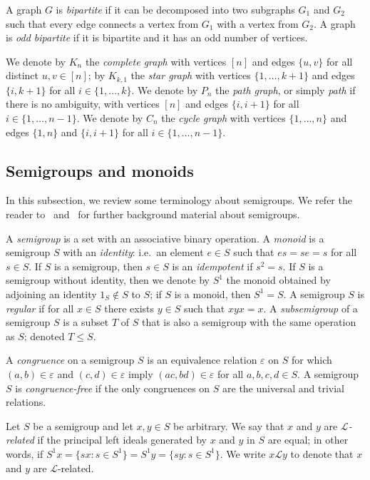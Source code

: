 \documentclass[ALCO,ThmDefs,Unicode,epreuves]{cedram}
\newcommand{\set}[2]{\{#1:#2\}}
\newcommand{\LL}{\mathcal{L}}
\newcommand{\nset}{[n]}
\begin{document}
A graph $G$ is \emph{bipartite} if it can be decomposed into two 
subgraphs $G_1$ and $G_2$ such that every edge
connects a vertex from $G_1$ with a vertex from $G_2$. A graph is
\emph{odd bipartite} if it is bipartite and it has an odd number of vertices.

We denote by $K_n$ the \emph{complete graph} with vertices $\nset$
and edges $\{u,v\}$ for all distinct $u,v \in \nset$; by $K_{k, 1}$
the \emph{star graph} with vertices $\{1, \ldots, k + 1\}$ and edges
$\{i, k + 1\}$ for all $i \in \{1, \ldots, k\}$. We denote by $P_n$ the
\emph{path graph}, or simply \emph{path} if there is no ambiguity, with vertices
$\nset$ and edges $\{i, i + 1\}$ for all $i \in \{1, \ldots, n-
1\}$. We denote by $C_n$ the \emph{cycle graph} with vertices $\{1, \ldots,
n\}$ and edges $\{1, n\}$ and $\{i, i + 1\}$ for all $i \in \{1, \ldots, n-
1\}$.


\subsection{Semigroups and monoids}
In this subsection, we review some terminology about semigroups.
We refer the reader to~\cite{Howie1995aa} and~\cite{Ganyushkin2009aa} for further background
material about semigroups.

A \emph{semigroup} is a set with an associative binary operation. A
\emph{monoid} is a semigroup $S$ with an \emph{identity}: i.e.\ an element
$e\in S$ such that $es = se = s$ for all $s \in S$. 
If $S$ is a semigroup, then $s\in S$ is an \emph{idempotent} if $s ^ 2 = s$.
If $S$ is a semigroup without identity, then we denote by $S ^ 1$ the monoid obtained by
adjoining an identity $1_S\not \in S$ to $S$; if $S$ is a monoid, then $S^1 = S$. 
A semigroup $S$ is \emph{regular} if for all $x\in S$ there exists $y\in S$
such that $xyx = x$. 
A \emph{subsemigroup} of a semigroup $S$ is a subset $T$ of $S$ that is
also a semigroup with the same operation as $S$; denoted $T\leq S$.

A \emph{congruence} on a semigroup $S$ is an equivalence relation
$\varepsilon$ on $S$ for which $(a,b)\in\varepsilon$ and $(c,d)\in\varepsilon$
imply $(ac,bd)\in\varepsilon$ for all $a,b,c,d\in S$. A semigroup $S$ is
\emph{congruence-free} if the only congruences on $S$ are the universal and
trivial relations.

Let $S$ be a semigroup and let $x,y\in S$ be arbitrary. We say that $x$ and $y$
are \emph{$\LL$-related} if the principal left ideals generated by $x$ and $y$
in $S$ are equal; in other words, if $S^1x = \set{sx}{s\in S ^ 1}=S^1y =
\set{sy}{s\in S ^ 1}$. We write $x\LL y$ to denote that $x$ and $y$ are
$\LL$-related.
\end{document}
